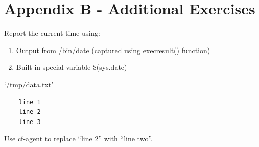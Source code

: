 



\chapter{Appendix B - Additional Exercises}





\begin{aside}
\label{aside:exercise_39}

Report the current time using:

\begin{enumerate}
\item{} Output from /bin/date (captured using execresult() function)
\item{} Built-in special variable \$(sys.date)
\end{enumerate}

\end{aside}





\begin{aside}
\label{aside:exercise_40}

`/tmp/data.txt'

\begin{verbatim}
    line 1
    line 2
    line 3
\end{verbatim}

Use cf-agent to replace ``line 2'' with ``line two''.

\end{aside}





